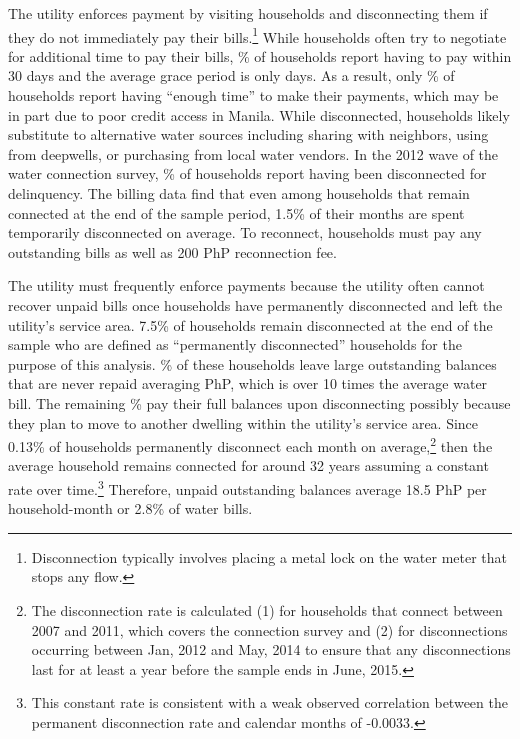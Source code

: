 \documentclass[12pt,table]{article}
\begin{document}
The utility enforces payment by visiting households and disconnecting them if they do not immediately pay their bills.\footnote{Disconnection typically involves placing a metal lock on the water meter that stops any flow.}  While households often try to negotiate for additional time to pay their bills, \unskip\% of households report having to pay within 30 days and the average grace period is only days.  As a result, only \unskip\% of households report having ``enough time'' to make their payments, which may be in part due to poor credit access in Manila.  While disconnected, households likely substitute to alternative water sources including sharing with neighbors, using from deepwells, or purchasing from local water vendors.  In the 2012 wave of the water connection survey, \unskip\% of households report having been disconnected for delinquency.  The billing data find that even among households that remain connected at the end of the sample period, 1.5\% of their months are spent temporarily disconnected on average.  To reconnect, households must pay any outstanding bills as well as 200 PhP reconnection fee.

The utility must frequently enforce payments because the utility often cannot recover unpaid bills once households have permanently disconnected and left the utility's service area.  7.5\% of households remain disconnected at the end of the sample who are defined as ``permanently disconnected'' households for the purpose of this analysis.  \unskip\% of these households leave large outstanding balances that are never repaid averaging PhP, which is over 10 times the average water bill.  The remaining \unskip\% pay their full balances upon disconnecting possibly because they plan to move to another dwelling within the utility's service area.  Since 0.13\% of households permanently disconnect each month on average,\footnote{The disconnection rate is calculated (1) for households that connect between 2007 and 2011, which covers the connection survey and (2) for disconnections occurring between Jan, 2012 and May, 2014 to ensure that any disconnections last for at least a year before the sample ends in June, 2015.} then the average household remains connected for around 32 years assuming a constant rate over time.\footnote{This constant rate is consistent with a weak observed correlation between the permanent disconnection rate and calendar months of -0.0033.}  Therefore, unpaid outstanding balances average 18.5 PhP per household-month or 2.8\% of water bills.
\end{document}
